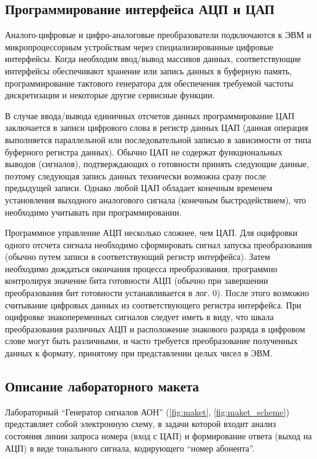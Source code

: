 \subsection{Программирование интерфейса АЦП и ЦАП}

Аналого-цифровые и цифро-аналоговые преобразователи подключаются к ЭВМ и микропроцессорным устройствам через специализированные цифровые интерфейсы. Когда необходим ввод/вывод массивов данных, соответствующие интерфейсы обеспечивают хранение или запись данных в буферную память, программирование тактового генератора для обеспечения требуемой частоты дискретизации и некоторые другие сервисные функции.

В случае ввода/вывода единичных отсчетов данных программирование ЦАП заключается в записи цифрового слова в регистр данных ЦАП (данная операция выполняется параллельной или последовательной записью в зависимости от типа буферного регистра данных). Обычно ЦАП не содержат функциональных выводов (сигналов), подтверждающих о готовности принять следующие данные, поэтому следующая запись данных технически возможна сразу после предыдущей записи. Однако любой ЦАП обладает конечным временем установления выходного аналогового сигнала (конечным быстродействием), что необходимо учитывать при программировании.

Программное управление АЦП несколько сложнее, чем ЦАП. Для оцифровки одного отсчета сигнала необходимо сформировать сигнал запуска преобразования (обычно путем записи в соответствующий регистр интерфейса). Затем необходимо дождаться окончания процесса преобразования, программно контролируя значение бита готовности АЦП (обычно при завершении преобразования бит готовности устанавливается в лог. 0). После этого возможно считывание цифровых данных из соответствующего регистра интерфейса. При оцифровке знакопеременных сигналов следует иметь в виду, что шкала преобразования различных АЦП и расположение знакового разряда в цифровом слове могут быть различными, и часто требуется преобразование полученных данных к формату, принятому при представлении целых чисел в ЭВМ.

\subsection{Описание лабораторного макета}

Лабораторный \enquote{Генератор сигналов АОН} (\autoref{fig:maket}, \autoref{fig:maket_scheme}) представляет собой электронную схему, в задачи которой входит анализ состояния линии запроса номера (вход с ЦАП) и формирование ответа (выход на АЦП) в виде тонального сигнала, кодирующего \enquote{номер абонента}.

